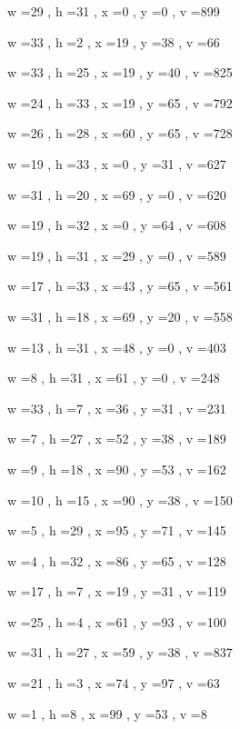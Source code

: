 \documentclass[11pt]{article}
\begin{document}
w =29 , h =31 , x =0 , y =0 , v =899
\par
w =33 , h =2 , x =19 , y =38 , v =66
\par
w =33 , h =25 , x =19 , y =40 , v =825
\par
w =24 , h =33 , x =19 , y =65 , v =792
\par
w =26 , h =28 , x =60 , y =65 , v =728
\par
w =19 , h =33 , x =0 , y =31 , v =627
\par
w =31 , h =20 , x =69 , y =0 , v =620
\par
w =19 , h =32 , x =0 , y =64 , v =608
\par
w =19 , h =31 , x =29 , y =0 , v =589
\par
w =17 , h =33 , x =43 , y =65 , v =561
\par
w =31 , h =18 , x =69 , y =20 , v =558
\par
w =13 , h =31 , x =48 , y =0 , v =403
\par
w =8 , h =31 , x =61 , y =0 , v =248
\par
w =33 , h =7 , x =36 , y =31 , v =231
\par
w =7 , h =27 , x =52 , y =38 , v =189
\par
w =9 , h =18 , x =90 , y =53 , v =162
\par
w =10 , h =15 , x =90 , y =38 , v =150
\par
w =5 , h =29 , x =95 , y =71 , v =145
\par
w =4 , h =32 , x =86 , y =65 , v =128
\par
w =17 , h =7 , x =19 , y =31 , v =119
\par
w =25 , h =4 , x =61 , y =93 , v =100
\par
w =31 , h =27 , x =59 , y =38 , v =837
\par
w =21 , h =3 , x =74 , y =97 , v =63
\par
w =1 , h =8 , x =99 , y =53 , v =8
\par
\newpage
\end{document}
